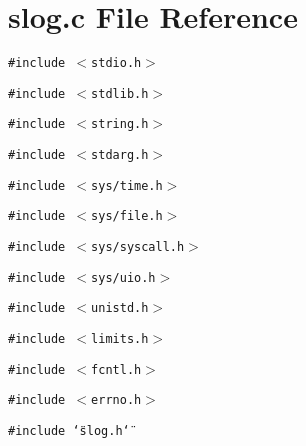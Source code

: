 \section{slog.c File Reference}
\label{slog_8c}
{\tt \#include $<$stdio.h$>$}\par
{\tt \#include $<$stdlib.h$>$}\par
{\tt \#include $<$string.h$>$}\par
{\tt \#include $<$stdarg.h$>$}\par
{\tt \#include $<$sys/time.h$>$}\par
{\tt \#include $<$sys/file.h$>$}\par
{\tt \#include $<$sys/syscall.h$>$}\par
{\tt \#include $<$sys/uio.h$>$}\par
{\tt \#include $<$unistd.h$>$}\par
{\tt \#include $<$limits.h$>$}\par
{\tt \#include $<$fcntl.h$>$}\par
{\tt \#include $<$errno.h$>$}\par
{\tt \#include \char`\"{}slog.h\char`\"{}}\par
